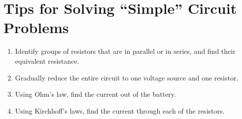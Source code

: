 %
%  

%  
%



\section{Tips for Solving ``Simple'' Circuit Problems}
  \begin{enumerate}
  \item Identify groups of resistors that are in parallel or in series, and
    find their equivalent resistance.
  \item Gradually reduce the entire circuit to one voltage source and one
    resistor.
  \item Using Ohm's law, find the current out of the battery.
  \item Using Kirchhoff's laws, find the current through each of the resistors.
  \end{enumerate}





